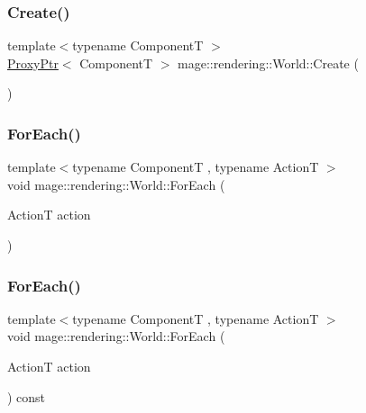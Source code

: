 \subsubsection{\texorpdfstring{Create()}{Create()}}
{\footnotesize\ttfamily template$<$typename ComponentT $>$ \\
\hyperlink{classmage_1_1_proxy_ptr}{Proxy\+Ptr}$<$ ComponentT $>$ mage\+::rendering\+::\+World\+::\+Create (\begin{DoxyParamCaption}{ }\end{DoxyParamCaption})}

\hypertarget{classmage_1_1rendering_1_1_world_a8c44f285282905dfe861564e5860b1e5}{}\label{classmage_1_1rendering_1_1_world_a8c44f285282905dfe861564e5860b1e5} 
\subsubsection{\texorpdfstring{For\+Each()}{ForEach()}\hspace{0.1cm}{\footnotesize\ttfamily [1/2]}}
{\footnotesize\ttfamily template$<$typename ComponentT , typename ActionT $>$ \\
void mage\+::rendering\+::\+World\+::\+For\+Each (\begin{DoxyParamCaption}\item[{ActionT}]{action }\end{DoxyParamCaption})}

\hypertarget{classmage_1_1rendering_1_1_world_af8a81616447d7e9716d38c5497aaf650}{}\label{classmage_1_1rendering_1_1_world_af8a81616447d7e9716d38c5497aaf650} 
\subsubsection{\texorpdfstring{For\+Each()}{ForEach()}\hspace{0.1cm}{\footnotesize\ttfamily [2/2]}}
{\footnotesize\ttfamily template$<$typename ComponentT , typename ActionT $>$ \\
void mage\+::rendering\+::\+World\+::\+For\+Each (\begin{DoxyParamCaption}\item[{ActionT}]{action }\end{DoxyParamCaption}) const}

